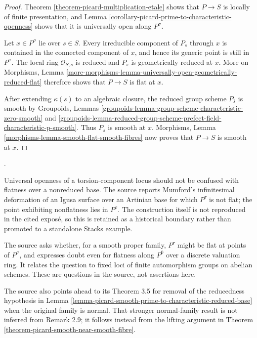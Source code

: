 \begin{proof}
Theorem \ref{theorem-picard-multiplication-etale} shows that $P\to S$ is
locally of finite presentation, and Lemma
\ref{corollary-picard-prime-to-characteristic-openness} shows that it is
universally open along $P^\sigma$.

Let $x\in P^\sigma$ lie over $s\in S$. Every irreducible component of $P_s$
through $x$ is contained in the connected component of $x$, and hence its
generic point is still in $P^\sigma$. The local ring $\mathcal O_{S,s}$ is
reduced and $P_s$ is geometrically reduced at $x$. More on Morphisms, Lemma
\ref{more-morphisms-lemma-universally-open-geometrically-reduced-flat}
therefore shows that $P\to S$ is flat at $x$.

After extending $\kappa(s)$ to an algebraic closure, the reduced group scheme
$P_{\overline{s}}$ is smooth by Groupoids, Lemmas
\ref{groupoids-lemma-group-scheme-characteristic-zero-smooth} and
\ref{groupoids-lemma-reduced-group-scheme-prefect-field-characteristic-p-smooth}.
Thus $P_s$ is smooth at $x$. Morphisms, Lemma
\ref{morphisms-lemma-smooth-flat-smooth-fibres} now proves that $P\to S$ is
smooth at $x$.
\end{proof}

\begin{remark}
\label{remark-picard-torsion-flatness-boundary}
\begin{reference}
\cite[Expos\'e 236, Remark 2.9, p. 235]{FGA}.
\end{reference}
Universal openness of a torsion-component locus should not be confused with
flatness over a nonreduced base. The source reports Mumford's infinitesimal
deformation of an Igusa surface over an Artinian base for which $P^\tau$ is
not flat; the point exhibiting nonflatness lies in $P^\rho$. The construction
itself is not reproduced in the cited expos\'e, so this is retained as a
historical boundary rather than promoted to a standalone Stacks example.

The source asks whether, for a smooth proper family, $P^\tau$ might be flat
at points of $P^\sigma$, and expresses doubt even for flatness along $P^0$
over a discrete valuation ring. It relates the question to fixed loci of
finite automorphism groups on abelian schemes. These are questions in the
source, not assertions here.

The source also points ahead to its Theorem 3.5 for removal of the reducedness
hypothesis in Lemma
\ref{lemma-picard-smooth-prime-to-characteristic-reduced-base} when the
original family is normal. That stronger normal-family result is not inferred
from Remark 2.9; it follows instead from the lifting argument in Theorem
\ref{theorem-picard-smooth-near-smooth-fibre}.
\end{remark}

